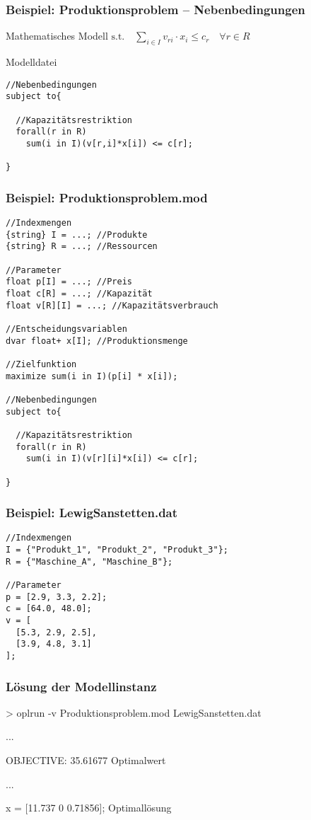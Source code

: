 \begin{frame}[fragile]\small
 \frametitle{Beispiel: Produktionsproblem -- Nebenbedingungen}
 \begin{block}{Mathematisches Modell}
  $\text{s.t.}\quad\displaystyle\sum_{i\in I} v_{ri}\cdot x_i \leq c_r  \quad\forall r\in R$
 \end{block}
 \begin{block}{Modelldatei}\scriptsize
\begin{lstlisting}[numbers=none]
//Nebenbedingungen
subject to{
  
  //Kapazitätsrestriktion
  forall(r in R)
    sum(i in I)(v[r,i]*x[i]) <= c[r];
  
}  
\end{lstlisting}
 \end{block}
\end{frame}

\begin{frame}[fragile]
 \frametitle{Beispiel: Produktionsproblem.mod}
 \medskip
\begin{lstlisting}[basicstyle=\scriptsize\ttfamily]
//Indexmengen
{string} I = ...; //Produkte
{string} R = ...; //Ressourcen

//Parameter
float p[I] = ...; //Preis
float c[R] = ...; //Kapazität
float v[R][I] = ...; //Kapazitätsverbrauch

//Entscheidungsvariablen
dvar float+ x[I]; //Produktionsmenge

//Zielfunktion
maximize sum(i in I)(p[i] * x[i]);

//Nebenbedingungen
subject to{
  
  //Kapazitätsrestriktion
  forall(r in R)
    sum(i in I)(v[r][i]*x[i]) <= c[r];
  
}   
\end{lstlisting}
\end{frame}

\begin{frame}[fragile]
 \frametitle{Beispiel: LewigSanstetten.dat}
 \medskip
\begin{lstlisting}[basicstyle=\scriptsize\ttfamily]
//Indexmengen
I = {"Produkt_1", "Produkt_2", "Produkt_3"}; 
R = {"Maschine_A", "Maschine_B"}; 
 
//Parameter
p = [2.9, 3.3, 2.2];
c = [64.0, 48.0];
v = [
  [5.3, 2.9, 2.5],
  [3.9, 4.8, 3.1]
]; 
\end{lstlisting}
\end{frame}

\begin{frame}
 \frametitle{Lösung der Modellinstanz}
 \ttfamily
 > oplrun -v Produktionsproblem.mod LewigSanstetten.dat
 \begin{center}
  \textsf ...
 \end{center}
 OBJECTIVE: 35.61677 \hfill\alert{\textsf{\textleftarrow{} Optimalwert}}
 \begin{center}
  \textsf ...
 \end{center}
 x = [11.737 0 0.71856]; \hfill\alert{\textsf{\textleftarrow{} Optimallösung}}
\end{frame}
